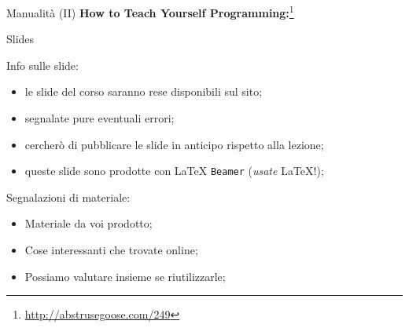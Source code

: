 \begin{frame}{Manualità (II)}
  \textbf{How to Teach Yourself Programming:}\footnote{\url{http://abstrusegoose.com/249}}
  \begin{center}
  \end{center}
  
\end{frame}

\begin{frame}{Slides}

  Info sulle slide:
  \begin{itemize}
    \item le slide del corso saranno rese disponibili sul sito;
    \item segnalate pure eventuali errori;
    \item cercherò di pubblicare le slide in anticipo rispetto alla lezione;
    \item queste slide sono prodotte con \LaTeX \; \texttt{Beamer} (\emph{usate} \LaTeX!);
  \end{itemize}

  Segnalazioni di materiale:
  \begin{itemize}
    \item Materiale da voi prodotto;
    \item Cose interessanti che trovate online;
    \item Possiamo valutare insieme se riutilizzarle;
  \end{itemize}
\end{frame}